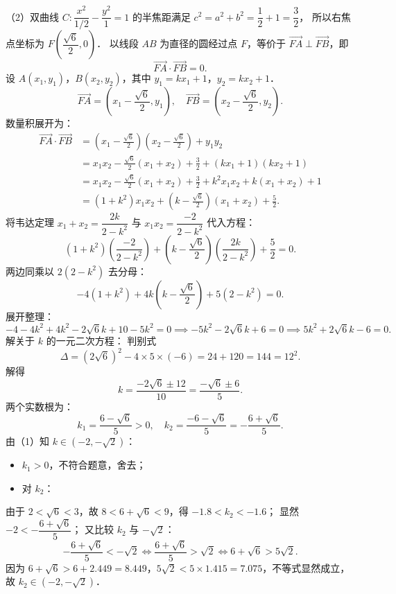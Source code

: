 \begin{answer}
（2）双曲线 $C: \dfrac{x^2}{1/2} - \dfrac{y^2}{1} = 1$ 的半焦距满足 $c^2 = a^2 + b^2 = \dfrac{1}{2} + 1 = \dfrac{3}{2}$，
所以右焦点坐标为 $F\left(\dfrac{\sqrt{6}}{2}, 0\right)$．
以线段 $AB$ 为直径的圆经过点 $F$，等价于 $\overrightarrow{FA} \perp \overrightarrow{FB}$，即
\nopagebreak[4]
\[
\overrightarrow{FA} \cdot \overrightarrow{FB} = 0.
\]
设 $A(x_1, y_1)$，$B(x_2, y_2)$，其中 $y_1 = kx_1 + 1$，$y_2 = kx_2 + 1$．
\nopagebreak[4]
\[
\overrightarrow{FA} = \left(x_1 - \frac{\sqrt{6}}{2}, y_1\right), \quad \overrightarrow{FB} = \left(x_2 - \frac{\sqrt{6}}{2}, y_2\right).
\]
数量积展开为：
\nopagebreak[4]
\[
\begin{aligned}
\overrightarrow{FA} \cdot \overrightarrow{FB} &= \left(x_1 - \frac{\sqrt{6}}{2}\right)\left(x_2 - \frac{\sqrt{6}}{2}\right) + y_1 y_2 \\
&= x_1 x_2 - \frac{\sqrt{6}}{2}(x_1 + x_2) + \frac{3}{2} + (kx_1 + 1)(kx_2 + 1) \\
&= x_1 x_2 - \frac{\sqrt{6}}{2}(x_1 + x_2) + \frac{3}{2} + k^2 x_1 x_2 + k(x_1 + x_2) + 1 \\
&= (1 + k^2) x_1 x_2 + \left(k - \frac{\sqrt{6}}{2}\right)(x_1 + x_2) + \frac{5}{2}.
\end{aligned}
\]
将韦达定理 $x_1 + x_2 = \dfrac{2k}{2 - k^2}$ 与 $x_1 x_2 = \dfrac{-2}{2 - k^2}$ 代入方程：
\nopagebreak[4]
\[
(1 + k^2)\left(\frac{-2}{2 - k^2}\right) + \left(k - \frac{\sqrt{6}}{2}\right)\left(\frac{2k}{2 - k^2}\right) + \frac{5}{2} = 0.
\]
两边同乘以 $2(2 - k^2)$ 去分母：
\nopagebreak[4]
\[
-4(1 + k^2) + 4k\left(k - \frac{\sqrt{6}}{2}\right) + 5(2 - k^2) = 0.
\]
展开整理：
\nopagebreak[4]
\[
-4 - 4k^2 + 4k^2 - 2\sqrt{6}k + 10 - 5k^2 = 0 \implies -5k^2 - 2\sqrt{6}k + 6 = 0 \implies 5k^2 + 2\sqrt{6}k - 6 = 0.
\]
解关于 $k$ 的一元二次方程：
判别式
\nopagebreak[4]
\[
\Delta = (2\sqrt{6})^2 - 4 \times 5 \times (-6) = 24 + 120 = 144 = 12^2.
\]
解得
\nopagebreak[4]
\[
k = \frac{-2\sqrt{6} \pm 12}{10} = \frac{-\sqrt{6} \pm 6}{5}.
\]
两个实数根为：
\nopagebreak[4]
\[
k_1 = \frac{6 - \sqrt{6}}{5} > 0, \quad k_2 = \frac{-6 - \sqrt{6}}{5} = -\frac{6 + \sqrt{6}}{5}.
\]
由（1）知 $k \in (-2, -\sqrt{2})$：
\begin{itemize}
\item $k_1 > 0$，不符合题意，舍去；
\item 对 $k_2$：
\end{itemize}
  由于 $2 < \sqrt{6} < 3$，故 $8 < 6 + \sqrt{6} < 9$，得 $-1.8 < k_2 < -1.6$；
  显然 $-2 < -\dfrac{6 + \sqrt{6}}{5}$；
  又比较 $k_2$ 与 $-\sqrt{2}$：
\nopagebreak[4]
\[
-\frac{6 + \sqrt{6}}{5} < -\sqrt{2} \iff \frac{6 + \sqrt{6}}{5} > \sqrt{2} \iff 6 + \sqrt{6} > 5\sqrt{2}.
\]
  因为 $6 + \sqrt{6} > 6 + 2.449 = 8.449$，$5\sqrt{2} < 5 \times 1.415 = 7.075$，不等式显然成立，
  故 $k_2 \in (-2, -\sqrt{2})$．


\end{answer}
